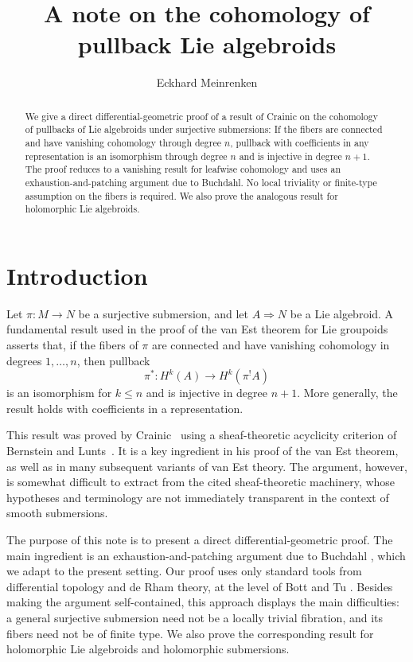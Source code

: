 \documentclass[11pt]{amsart}
\theoremstyle{definition}
\theoremstyle{remark}
\newcommand{\Ra}{\Rightarrow}
\begin{document}
\sloppy
\title{A note on the cohomology of pullback Lie algebroids}
\author{Eckhard Meinrenken}

\begin{abstract}		
We give a direct differential-geometric proof of a result of Crainic on the cohomology of pullbacks of Lie algebroids under surjective submersions: 
If the fibers are connected and have vanishing cohomology through
degree $n$, pullback with coefficients in any representation is an
isomorphism through degree $n$ and is injective in degree $n+1$.
The proof reduces  to a  vanishing result for leafwise cohomology and uses an exhaustion-and-patching argument due to Buchdahl. No local triviality or finite-type assumption on the fibers is required. We also prove the analogous result for holomorphic Lie algebroids.
\end{abstract}

\maketitle

\section{Introduction}


Let $\pi\colon M\to N$ be a surjective submersion, and let
$A\Ra  N$ be a Lie algebroid. A fundamental result used in the proof of the van Est theorem for Lie groupoids \cite{cra:dif} 
asserts that, if the
fibers of $\pi$ are connected and have vanishing cohomology
in degrees $1,\ldots,n$, then pullback 
\[
\pi^*\colon H^k(A)\longrightarrow H^k(\pi^!A)
\]
is an isomorphism for $k\leq n$ and is injective in degree $n+1$.
More generally, the result holds with coefficients in a
representation.

This result was proved by Crainic~\cite[Theorem~2]{cra:dif} using a
sheaf-theoretic acyclicity criterion of Bernstein and
Lunts~\cite{ber:equ}. It is a key ingredient in his proof of
the van Est theorem, as well as in many subsequent variants of van Est
theory. The argument, however, is somewhat difficult to extract from
the cited sheaf-theoretic machinery, whose hypotheses and terminology
are not immediately transparent in the context of smooth
submersions.


The purpose of this note is to present a direct differential-geometric
proof. The main ingredient is an exhaustion-and-patching argument due
to Buchdahl \cite{buc:rel}, which we adapt to the present setting.
Our proof uses only standard tools from differential topology and de
Rham theory, at the level of Bott and Tu \cite{bo:di}. Besides making
the argument self-contained, this approach displays  the
main difficulties: a general surjective submersion need not be a locally
trivial fibration, and its fibers need not be of finite type. We also prove the corresponding result for holomorphic 
Lie algebroids and holomorphic submersions. 
\end{document}
